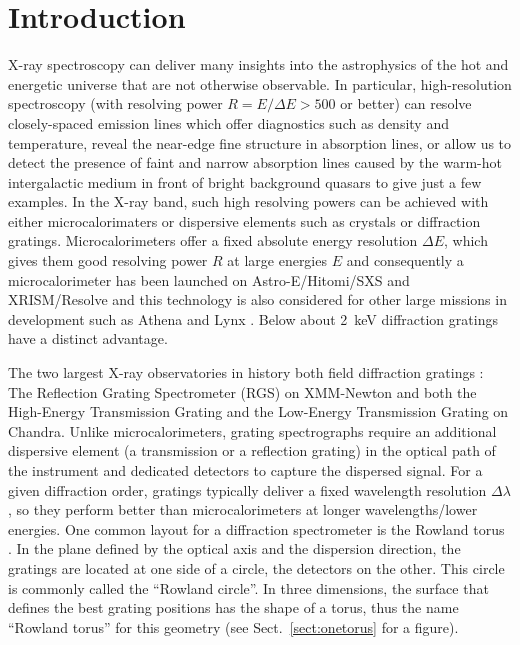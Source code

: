 \documentclass[linenumbers]{aastex631}
\begin{document}


\section{Introduction} \label{sec:intro}
X-ray spectroscopy can deliver many insights into the astrophysics of the hot and energetic universe that are not otherwise observable. In particular, high-resolution spectroscopy (with resolving power $R=E/\Delta E> 500$ or better) can resolve closely-spaced emission lines which offer diagnostics such as density and temperature, reveal the near-edge fine structure in absorption lines, or allow us to detect the presence of faint and narrow absorption lines caused by the warm-hot intergalactic medium in front of bright background quasars to give just a few examples. In the X-ray band, such high resolving powers can be achieved with either microcalorimaters or dispersive elements such as crystals or diffraction gratings. Microcalorimeters offer a fixed absolute energy resolution $\Delta E$, which gives them good resolving power $R$ at large energies $E$ and consequently a microcalorimeter has been launched on Astro-E/Hitomi/SXS \citep{2014SPIE.9144E..2AM} and XRISM/Resolve \citep{2018JATIS...4a1214K} and this technology is also considered for other large missions in development such as Athena \citep{2014SPIE.9144E..2LR} and Lynx \citep{2019JATIS...5b1017B}. Below about 2~keV diffraction gratings have a distinct advantage.

The two largest X-ray observatories in history both field diffraction gratings \citep[see][for a review]{2010SSRv..157...15P}: The Reflection Grating Spectrometer (RGS) on XMM-Newton \citep{2001A&A...365L...7D} and both the High-Energy Transmission Grating  \citep[HETG,][]{2005PASP..117.1144C} and the Low-Energy Transmission Grating \citep[LETG,][]{1997SPIE.3113..172P} on Chandra.
Unlike microcalorimeters, grating spectrographs require an additional dispersive element (a transmission or a reflection grating) in the optical path of the instrument and dedicated detectors to capture the dispersed signal. For a given diffraction order, gratings typically deliver a fixed wavelength resolution $\Delta \lambda$, so they perform better than microcalorimeters at longer wavelengths/lower energies. One common layout for a diffraction spectrometer is the Rowland torus \citep{Beuermann:78}. In the plane defined by the optical axis and the dispersion direction, the gratings are located at one side of a circle, the detectors on the other. This circle is commonly called the ``Rowland circle''. In three dimensions, the surface that defines the best grating positions has the shape of a torus, thus the name ``Rowland torus'' for this geometry (see Sect.~\ref{sect:onetorus} for a figure).
\end{document}
